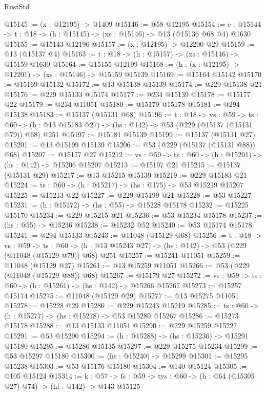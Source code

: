 \begin{lexlean}{RustStd}
\begin{coremodule}
@15145 := (x : @12195) -> @1409
@15146 := @58 @12195
@15154 := {e : @15144} -> {t : @18} -> (h : @15145) -> (xs : @15146) -> @13 (@15136 @68 @4) @1630
@15155 := @15143 @12196
@15157 := (x : @12195) -> @12200 @29
@15159 := @13 (@15137 @4)
@15163 := {t : @18} -> (h : @15157) -> (xs : @15146) -> @15159 @1630
@15164 := @15155 @12199
@15168 := (h : (x : @12195) -> @12201) -> (xs : @15146) -> @15159 @15139
@15169 := @15164 @15142
@15170 := @15169 @15132
@15172 := @13 @15138 @15139
@15174 := @229 @15138 @21
@15176 := @229 @15133 @15174
@15177 := @234 @15139
@15178 := @15177 @22
@15179 := @234 @11051
@15180 := @15179 @15178
@15181 := @294 @15138
@15183 := @15137 (@15131 @68)
@15196 := {t : @18} ->
  {vs : @59} ->
  {ts : @60} -> (h : @13 @15183 @27) -> (hs : @142) -> @53 (@229 (@15137 (@15131 @79)) @68) @251
@15197 := @15181 @15139
@15199 := @15137 (@15131 @27)
@15201 := @13 @15199 @15139
@15206 := @53 (@229 (@15137 (@15131 @88)) @68)
@15207 := @15177 @27
@15212 := {vs : @59} -> {ts : @60} -> (h : @15201) -> (hs : @142) -> @15206 @15207
@15213 := @15197 @21
@15215 := @15137 (@15131 @29)
@15217 := @13 @15215 @15139
@15219 := @229 @15183 @21
@15224 := {ts : @60} -> (h : @15217) -> (hs : @175) -> @53 @15219 @15207
@15225 := @15213 @22
@15227 := @229 @15199 @21
@15228 := @53 @15227
@15231 := (h : @15172) -> (hs : @55) -> @15228 @15178
@15232 := @15225 @15170
@15234 := @229 @15215 @21
@15236 := @53 @15234 @15178
@15237 := (hs : @55) -> @15236
@15238 := @15232 @52
@15240 := @53 @15174 @15178
@15241 := @294 @15133
@15243 := @11048 (@15129 @68)
@15256 := {t : @18} ->
  {vs : @59} ->
  {ts : @60} -> (h : @13 @15243 @27) -> (hs : @142) -> @53 (@229 (@11048 (@15129 @79)) @68) @251
@15257 := @15241 @11051
@15259 := @11048 (@15129 @27)
@15261 := @13 @15259 @11051
@15266 := @53 (@229 (@11048 (@15129 @88)) @68)
@15267 := @15179 @27
@15272 := {vs : @59} -> {ts : @60} -> (h : @15261) -> (hs : @142) -> @15266 @15267
@15273 := @15257 @15174
@15275 := @11048 (@15129 @29)
@15277 := @13 @15275 @11051
@15278 := @15228 @29
@15280 := @229 @15243 @15219
@15285 := {ts : @60} -> (h : @15277) -> (hs : @15278) -> @53 @15280 @15267
@15286 := @15273 @15178
@15288 := @13 @15133 @11051
@15290 := @229 @15259 @15227
@15291 := @53 @15290
@15294 := (h : @15288) -> (hs : @15236) -> @15291 @15180
@15295 := @15286 @15135
@15297 := @229 @15275 @15234
@15299 := @53 @15297 @15180
@15300 := (hs : @15240) -> @15299
@15301 := @15295 @15238
@15303 := @53 @15176 @15180
@15304 := @140 @15124
@15305 := @105 @15124
@15314 := {k : @57} ->
  {fs : @59} -> {tys : @60} -> (h : @64 (@15305 @27) @74) -> (hf : @142) -> @143 @15125

\end{coremodule}
\end{lexlean}
